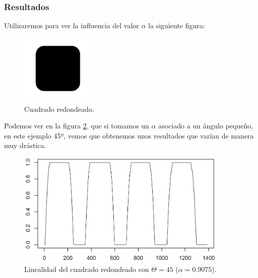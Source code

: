 \subsubsection{Resultados}

Utilizaremos para ver la influencia del valor $\alpha$ la siguiente figura:\\

\begin{figure}[H]
\begin{center}

\includegraphics[width=0.3\textwidth]{img/device3-1.png}
\end{center}

\caption{Cuadrado redondeado.}
\label{cuadrado-red}
\end{figure}

Podemos ver en la figura \ref{fig6}, que si tomamos un $\alpha$ asociado a un ángulo pequeño, en este ejemplo 45º, vemos que obtenemos unos resultados que varían de manera muy drástica.

\begin{figure}[H]
\begin{center}

\includegraphics[width=0.9\textwidth]{img/lin-dev3-1-limpio-09075.png}
\end{center}

\caption{Linealidad del cuadrado redondeado con $\Theta = 45$ ($\alpha = 0.9075$).}
\label{fig6}
\end{figure}

